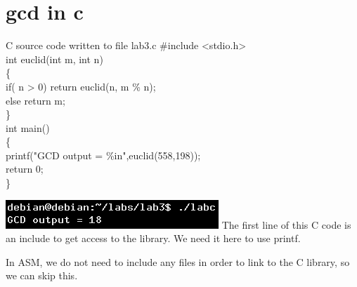 \documentclass{article}
\begin{document}
\hypertarget{p4}{\section{gcd in c}}
\begin{GFT}{C source code written to file lab3.c}
\+\#include <stdio.h>\\
\+int euclid(int m, int n)\\
\+\{\\
\+  if( n > 0) return euclid(n, m \% n);\\
\+  else return m;\\
\+\}\\
\+int main()\\
\+\{\\
\+  printf("GCD output = \%i\Backslash{}n",euclid(558,198));\\
\+  return 0;\\
\+\}\\
\end{GFT}
\includegraphics[scale=0.5]{euclidc.png}
\clearpage
The first line of this C code is an include to get access to the library. We need it here to use printf.

In ASM, we do not need to include any files in order to link to the C library, so we can skip this.
\end{document}

